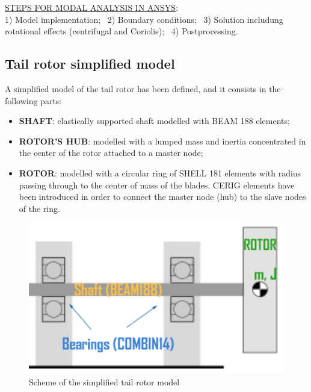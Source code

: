 \noindent
\underline{STEPS FOR MODAL ANALYSIS IN ANSYS}: \\
1) Model implementation; \
2) Boundary conditions; \
3) Solution includung rotational effects (centrifugal and Coriolis); \
4) Postprocessing.



\subsection*{Tail rotor simplified model}
\noindent
A simplified model of the tail rotor has been defined, and it consists in the following parts:
\begin{itemize}
	\item \textbf{SHAFT}: elastically supported shaft modelled with BEAM 188 elements;
	\item \textbf{ROTOR'S HUB}: modelled with a lumped mass and inertia concentrated in the center of the rotor attached to a master node;
	\item \textbf{ROTOR}: modelled with a circular ring of SHELL 181 elements with radius passing through to the center of mass of the blades. CERIG elements have been introduced in order to connect the master node (hub) to the slave nodes of the ring.
\end{itemize}

\medskip
\begin{figure}[h]
	\begin{center}
		\centering  		 		
		\includegraphics[width=0.7\linewidth]{PICTURES/5_Rotordynamics/scheme.png}
	\end{center}
	\caption {Scheme of the simplified tail rotor model}
\end{figure}

